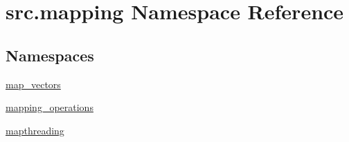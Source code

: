 \hypertarget{namespacesrc_1_1mapping}{}\section{src.\+mapping Namespace Reference}
\label{namespacesrc_1_1mapping}
\subsection*{Namespaces}
\begin{DoxyCompactItemize}
\item 
 \hyperlink{namespacesrc_1_1mapping_1_1map__vectors}{map\+\_\+vectors}
\item 
 \hyperlink{namespacesrc_1_1mapping_1_1mapping__operations}{mapping\+\_\+operations}
\item 
 \hyperlink{namespacesrc_1_1mapping_1_1mapthreading}{mapthreading}
\end{DoxyCompactItemize}
